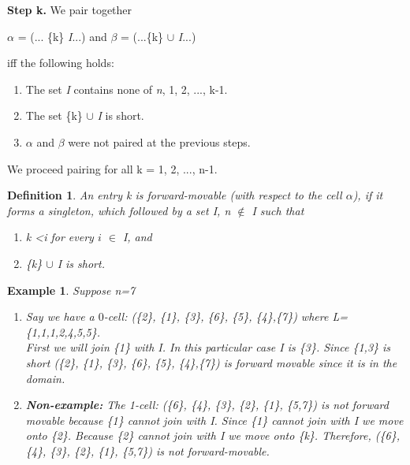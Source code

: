 \documentclass{amsart}
\newtheorem{Definition}[theorem]{Definition}
\newtheorem{Example}[theorem]{Example}
\newenvironment{definition}{\begin{Definition}\normalfont}{\end{Definition}}
\newenvironment{example}{\begin{Example}\normalfont}{\end{Example}}
\begin{document}
\textbf{Step k.} We pair together\\
\begin{center}
$\alpha$ = (... \{k\} \textit{I}...) and $\beta$ = (...\{k\} $\cup$ \textit{I}...)
\end{center}

iff the following holds: 
\begin{enumerate}
\item The set \textit{I} contains none of \textit{n}, 1, 2, ..., k-1.
\item The set \{k\} $\cup$ \textit{I} is short.
\item $\alpha$ and $\beta$ were not paired at the previous steps.
\end{enumerate}
We proceed pairing for all k = 1, 2, ..., n-1.

\begin{definition}
\cite{PANZU} An entry \textit{k} is \textit{forward-movable} (with respect to the cell $\alpha$), if it forms a singleton, which followed by a set \textit{I}, \textit{n} $\not\in$ \textit{I} such that
\begin{enumerate}
\item {\textit{k} \textless \textit{i} for every $\textit{i}$ $\in$ \textit{I}, and}
\item{\{\textit{k}\} $\cup$ \textit{I} is short.}
\end{enumerate}
\end{definition}

\begin{example} 
Suppose \textit{n}=7\\
\begin{enumerate}
\item Say we have a $0$-cell: (\{2\}, \{1\}, \{3\}, \{6\}, \{5\}, \{4\},\{7\}) where L= \{1,1,1,2,4,5,5\}.\\
First we will join \{1\} with \textit{I}. In this particular case \textit{I} is \{3\}. Since \{1,3\} is short (\{2\}, \{1\}, \{3\}, \{6\}, \{5\}, \{4\},\{7\}) is forward movable since it is in the domain. 

\item \textbf{Non-example:} The 1-cell: (\{6\}, \{4\}, \{3\}, \{2\}, \{1\}, \{5,7\}) is not forward movable because \{1\} cannot join with \textit{I}. Since \{1\} cannot join with \textit{I} we move onto \{2\}. Because \{2\} cannot join with \textit{I} we move onto \textit{\{k\}}. Therefore, (\{6\}, \{4\}, \{3\}, \{2\}, \{1\}, \{5,7\}) is not forward-movable.       
\end{enumerate}
\end{example}
\end{document}
